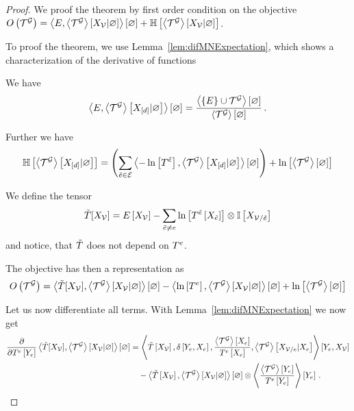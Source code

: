 \begin{proof}%
	We proof the theorem by first order condition on the objective $\objof{\extnet} = \sbcontraction{\energytensor,\extnetdist} + \sentropyof{\extnetdist}$.
	
	To proof the theorem, we use Lemma~\ref{lem:difMNExpectation}, which shows a characterization of the derivative of functions
	
	We have %
	\begin{align*}
		\sbcontraction{\energytensor,\normationof{\extnet}{\shortcatvariables}} 
		=  \frac{
			\contraction{\{\energytensor\}\cup\extnet} 
		}{
			\contraction{\extnet} 			
		} \, . 
	\end{align*}
	
	Further we have
	\begin{align*}
		\sentropyof{\normationof{\extnet}{\shortcatvariables}}
		= \left(\sum_{\secedge\in\edges} \contraction{-\lnof{\hypercoreof{\secedge}},\normationof{\extnet}{\shortcatvariables}} \right)
		+ \lnof{\contraction{\extnet}}	
	\end{align*}
	
	We define the tensor
		\[ \sechypercore[\catvariableof{\nodes}] = \energytensorat{\catvariableof{\nodes}} 
		- \sum_{\secedge\neq\edge} \lnof{\hypercoreofat{\secedge}{\catvariableof{\secedge}}} \otimes \onesat{\catvariableof{\nodes/\secedge}} \]
	and notice, that $\sechypercore$ does not depend on $\hypercoreof{\edge}$.	

	The objective has then a representation as
	\begin{align*}
		\objof{\extnet} = \sbcontraction{\sechypercore[\catvariableof{\nodes}], \extnetdist} - \sbcontraction{ \lnof{\hypercoreof{\edge}}, \extnetdist} +  \lnof{\contraction{\extnet}}
	\end{align*}
	
	Let us now differentiate all terms.
	With Lemma~\ref{lem:difMNExpectation} we now get
	\begin{align*}
		\difwrt{\hypercoreofat{\edge}{\seccatvariableof{\edge}}} \sbcontraction{\sechypercore[\catvariableof{\nodes}], \extnetdist}
		& = \sbcontractionof{\sechypercoreat{\nodevariables},
	 	\identityat{\seccatvariableof{\edge},\edgevariables}, 
		\frac{\contractionof{\extnet}{\edgevariables}}{\hypercoreofat{\edge}{\edgevariables}}, 
		\normationofwrt{\extnet}{\catvariableof{\nodes/\edge}}{\edgevariables} }{\seccatvariableof{\edge},\nodevariables} \\
		& \quad -  \contraction{\sechypercoreat{\nodevariables},\extnetdist}
		 \otimes \sbcontractionof{\frac{\contractionof{\extnet}{\seccatvariableof{\edge}}}{\hypercoreofat{\edge}{\seccatvariableof{\edge}}}
		}{\seccatvariableof{\edge}} \, .
	\end{align*}
	

\end{proof}
